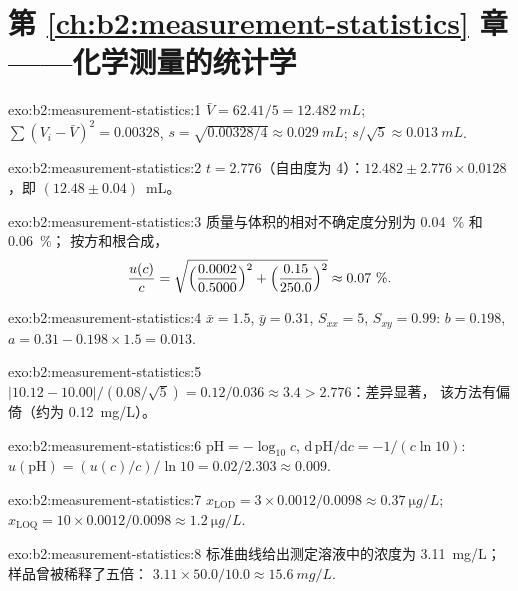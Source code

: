 \section*{第 \ref{ch:b2:measurement-statistics} 章——化学测量的统计学}

\begin{solution}{exo:b2:measurement-statistics:1}
$\bar V = 62.41/5 = \qty{12.482}{mL}$; $\sum(V_i - \bar V)^2 = 0.00328$, $s = \sqrt{0.00328/4} \approx
\qty{0.029}{mL}$; $s/\sqrt5 \approx \qty{0.013}{mL}$.
\end{solution}

\begin{solution}{exo:b2:measurement-statistics:2}
$t = 2.776$（自由度为 4）：$12.482 \pm 2.776 \times 0.0128$，即 $(12.48 \pm 0.04)$~mL。
\end{solution}

\begin{solution}{exo:b2:measurement-statistics:3}
质量与体积的相对不确定度分别为 0.04~\% 和 0.06~\%；
按方和根合成，
\[\frac{u(c)}{c} = \sqrt{\Bigl(\frac{0.0002}{0.5000}\Bigr)^2 + \Bigl(\frac{0.15}{250.0}\Bigr)^2}
\approx 0.07~\%.\]
\end{solution}

\begin{solution}{exo:b2:measurement-statistics:4}
$\bar x = 1.5$, $\bar y = 0.31$, $S_{xx} = 5$, $S_{xy} = 0.99$: $b = 0.198$, $a = 0.31 - 0.198 \times 1.5
= 0.013$.
\end{solution}

\begin{solution}{exo:b2:measurement-statistics:5}
$|10.12 - 10.00|/(0.08/\sqrt5) = 0.12/0.036 \approx 3.4 > 2.776$：差异显著，
该方法有偏倚（约为 \qty{+0.12}{mg/L}）。
\end{solution}

\begin{solution}{exo:b2:measurement-statistics:6}
$\mathrm{pH} = -\log_{10}c$, $\mathrm d\,\mathrm{pH}/\mathrm dc = -1/(c\ln10)$:
$u(\mathrm{pH}) = (u(c)/c)/\ln10 = 0.02/2.303 \approx 0.009$.
\end{solution}

\begin{solution}{exo:b2:measurement-statistics:7}
$x_{\mathrm{LOD}} = 3 \times 0.0012/0.0098 \approx \qty{0.37}{\micro g/L}$; $x_{\mathrm{LOQ}} = 10
\times 0.0012/0.0098 \approx \qty{1.2}{\micro g/L}$.
\end{solution}

\begin{solution}{exo:b2:measurement-statistics:8}
标准曲线给出测定溶液中的浓度为 \qty{3.11}{mg/L}；样品曾被稀释了五倍：
$3.11 \times 50.0/10.0 \approx \qty{15.6}{mg/L}$.
\end{solution}

